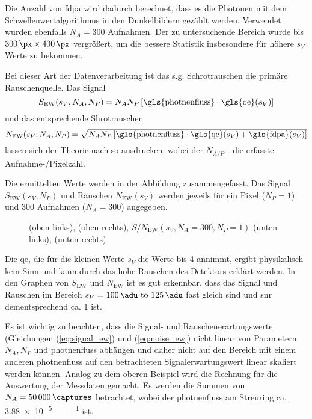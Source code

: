 \noindent
Die Anzahl von \gls{fdpa} wird dadurch berechnet, dass es die Photonen mit dem Schwellenwertalgorithmus in den Dunkelbildern gezählt werden. Verwendet wurden ebenfalls $N_A = 300$ Aufnahmen. Der zu untersuchende Bereich wurde bis $\qtyproduct{300 x 400}{\px}$ vergrößert, um die bessere Statistik insbesondere für höhere $s_V$ Werte zu bekommen.

\noindent
Bei dieser Art der Datenverarbeitung ist das s.g. Schrotrauschen die primäre Rauschenquelle. Das Signal 
\begin{equation}
        S_{\text{EW}}(s_V, N_A, N_P) = N_{A}N_{P}\left[\text{\gls{photnenfluss}}\cdot\text{\gls{qe}}(s_V)\right]
        \label{eq:signal_ew}
\end{equation}
und das entsprechende Shrotrauschen 
\begin{equation}
        N_{\text{EW}}(s_V, N_A, N_P) = \sqrt{N_{A}N_{P}\left[\text{\gls{photnenfluss}}\cdot\text{\gls{qe}}(s_V) + \text{\gls{fdpa}}(s_V)\right]}
        \label{eq:noise_ew}
\end{equation}
lassen sich der Theorie nach so ausdrucken, wobei der $N_{A/P}$ - die erfasste Aufnahme-/Pixelzahl. 

\noindent
Die ermittelten Werte werden in der Abbildung zusammengefasst. Das Signal $S_{\text{EW}}(s_V, N_P)$ und Rauschen $ N_{\text{EW}}(s_V)$ werden jeweils für ein Pixel ($N_P = 1$) und 300 Aufnahmen ($N_A = 300$) angegeben.
\begin{figure}[H]
    \centering
    
    \caption{(oben links), (oben rechts), $S/N_{\text{EW}}(s_V, N_A = 300, N_P = 1)$ (unten links), (unten rechts)}
    \label{fig:qe_fehldetektiert_signal_noise}
\end{figure}
\noindent
Die \gls{qe}, die für die kleinen Werte $s_V$ die Werte bis 4 annimmt, ergibt physikalisch kein Sinn und kann durch das hohe Rauschen des Detektors erklärt werden. In den Graphen von $S_{\text{EW}}$ und $N_{\text{EW}}$ ist es gut erkennbar, dass das Signal und Rauschen im Bereich $s_V = \text{\SIrange{100}{125}{\adu}}$ fast gleich sind und \gls{snr} dementsprechend ca. 1 ist.

\noindent
Es ist wichtig zu beachten, dass die Signal- und Rauschenerartungswerte (Gleichungen (\ref{eq:signal_ew}) und  (\ref{eq:noise_ew}) nicht linear von Parametern $N_A, N_P$ und \gls{photnenfluss} abhängen und daher nicht auf den Bereich mit einem anderen \gls{photnenfluss} auf den betrachteten Signalerwartungswert linear skaliert werden können. Analog zu dem oberen Beispiel wird die Rechnung für die Auswertung der Messdaten gemacht. Es werden die Summen von $N_A = \SI{50000}{\captures}$ betrachtet, wobei der \gls{photnenfluss} am Streuring ca. \SI{3.88e-5}{\photons\per\pixel\per\capture} ist.


